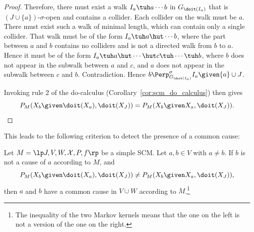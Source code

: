 \begin{proof}
Therefore, there must exist a walk $I_a \tuh a \cdots b$ in $G_{\doit(I_a)}$ that is $(J \cup \{a\})$-$\sigma$-open and contains a collider. 
Each collider on the walk must be $a$. 
There must exist such a walk of minimal length, which can contain only a single collider.
That walk must be of the form %
$I_a \tuh a \hut \cdots b$,
where the part between $a$ and $b$ contains no colliders and is not a directed walk from $b$ to $a$. 
Hence it must be of the form
$I_a \tuh a \hut \cdots \hut c \tuh \cdots \tuh b$, where $b$ does not appear in the subwalk between
$a$ and $c$, and $a$ does not appear in the subwalk between $c$ and $b$.
Contradiction.
Hence $b \Perp^\sigma_{G_{\doit(I_a)}} I_a \given \{a\} \cup J$.

Invoking rule 2 of the do-calculus (Corollary~\ref{cor:scm_do_calculus}) then gives 
  $$P_{M}(X_b \given \doit(X_a), \doit(X_J)) = P_{M}(X_b \given X_a, \doit(X_J)).$$
\end{proof}
This leads to the following criterion to detect the presence of a common cause:
\begin{Cor}\label{cor:scm_identify_confounder}
Let $M = \lt \Sin, \Send, \Srnd, \CX, P, f \rt$ be a simple SCM.
Let $a, b \in V$ with $a \ne b$.
If $b$ is not a cause of $a$ according to $M$, and
  $$P_{M}(X_b \given \doit(X_a), \doit(X_J)) \ne P_{M}(X_b \given X_a, \doit(X_J)),$$
then $a$ and $b$ have a common cause in $V \cup W$ according to $M$.\footnote{The inequality of the two Markov kernels means that the one on the left is not a version of the one on the right.}

\end{Cor}
